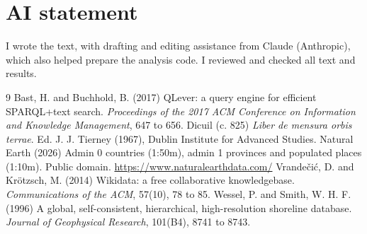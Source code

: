\documentclass[11pt,a4paper]{article}
\begin{document}
\section*{AI statement}
I wrote the text, with drafting and editing assistance from Claude (Anthropic), which also helped prepare the analysis code. I reviewed and checked all text and results.

\begin{thebibliography}{9}
 Bast, H. and Buchhold, B. (2017) QLever: a query engine for efficient SPARQL+text search. \emph{Proceedings of the 2017 ACM Conference on Information and Knowledge Management}, 647 to 656.
 Dicuil (c. 825) \emph{Liber de mensura orbis terrae}. Ed. J. J. Tierney (1967), Dublin Institute for Advanced Studies.
 Natural Earth (2026) Admin 0 countries (1:50m), admin 1 provinces and populated places (1:10m). Public domain. \url{https://www.naturalearthdata.com/}
 Vrandečić, D. and Krötzsch, M. (2014) Wikidata: a free collaborative knowledgebase. \emph{Communications of the ACM}, 57(10), 78 to 85.
 Wessel, P. and Smith, W. H. F. (1996) A global, self-consistent, hierarchical, high-resolution shoreline database. \emph{Journal of Geophysical Research}, 101(B4), 8741 to 8743.
\end{thebibliography}
\end{document}

